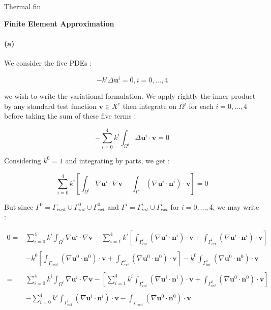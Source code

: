 \documentclass[a4paper]{article}
\date{}
\author{Philippe Ricka}
\title{}
\newcounter{c}
\newcounter{d}
\newcounter{r}
\newcounter{e}
\newcommand{\chapitre}[1]{\stepcounter{c}\setcounter{e}{0}\setcounter{d}{0}\setcounter{r}{0}\noindent\textbf{\Large#1}\\}
\newcommand{\bu}{\mathbf u}
\newcommand{\bv}{\mathbf v}
\begin{document}

\begin{center}\huge Thermal fin\end{center}

\bigskip

\chapitre{Finite Element Approximation}


\paragraph{(a)}We consider the five PDEs :

$$-k^i\Delta\bu^i=0,i=0,...,4$$


\noindent we wish to write the variational formulation. We apply rightly the inner product by any standard test function $\bv\in X^e$ then integrate on $\Omega^i$ for each $i=0,...,4$ before taking the sum of these five terms :

$$-\sum_{i=0}^4k^i\int_{\Omega^i}\Delta\bu^i\cdot\bv=0$$


Considering $k^0=1$ and integrating by parts, we get :

$$\sum_{i=0}^4k^i\left[\int_{\Omega^i}\nabla\bu^i\cdot\nabla\bv-\int_{\Gamma^i}(\nabla\bu^i\cdot\mathbf n^i)\cdot\bv\right]=0$$


But since $\Gamma^0=\Gamma_{root}\cup\Gamma^0_{int}\cup\Gamma^0_{ext}$ and $\Gamma^i=\Gamma^i_{int}\cup\Gamma^i_{ext}$ for $i=0,...,4$, we may write :

$$\begin{array}{rl}0=&\displaystyle\sum_{i=0}^4k^i\int_{\Omega^i}\nabla\bu^i\cdot\nabla\bv-\sum_{i=1}^4k^i\left[\int_{\Gamma^i_{int}}(\nabla\bu^i\cdot\mathbf n^i)\cdot\bv+\int_{\Gamma_{ext}^i}(\nabla\bu^i\cdot\mathbf n^i)\cdot\bv\right]\\
&\\
&\displaystyle-k^0\left[\int_{\Gamma_{root}}(\nabla\bu^0\cdot\mathbf n^0)\cdot\bv+\int_{\Gamma^0_{ext}}(\nabla\bu^0\cdot\mathbf n^0)\cdot\bv\right]-k^0\int_{\Gamma^0_{int}}(\nabla\bu^0\cdot\mathbf n^0)\cdot\bv\\
&\\
=&\displaystyle\sum_{i=0}^4k^i\int_{\Omega^i}\nabla\bu^i\cdot\nabla\bv-\left[\sum_{i=1}^4k^i\int_{\Gamma^i_{int}}(\nabla\bu^i\cdot\mathbf n^i)\cdot\bv+\int_{\Gamma^0_{int}}(\nabla\bu^0\cdot\mathbf n^0)\cdot\bv\right]\\
&\\
&\displaystyle-\sum_{i=0}^4k^i\int_{\Gamma^i_{ext}}(\nabla\bu^i\cdot\mathbf n^i)\cdot\bv-\int_{\Gamma_{root}}(\nabla\bu^0\cdot\mathbf n^0)\cdot\bv
\end{array}$$
\end{document}
